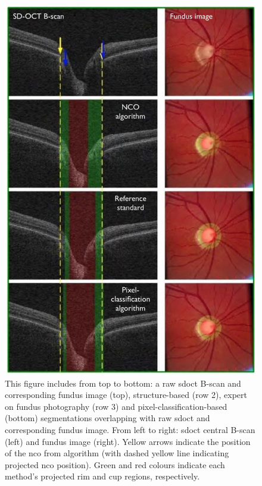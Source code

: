 \begin{figure}[H]
\centering
\includegraphics{figures/morgan_6}
\caption{This figure includes from top to bottom: a raw \Gls{sdoct} B-scan
and corresponding fundus image (top), structure-based (row 2), expert on
fundus photography (row 3) and pixel-classification-based (bottom)
segmentations overlapping with raw \Gls{sdoct} and corresponding fundus
image.  From left to right: \Gls{sdoct} central B-scan (left) and fundus image
(right). Yellow arrows indicate the position of the \Gls{nco} from algorithm
(with dashed yellow line indicating projected \Gls{nco} position). Green and
red colours indicate each method's projected rim and cup regions,
respectively. \cite{mbib_4} }
\label{fig:m_6}
\end{figure}

